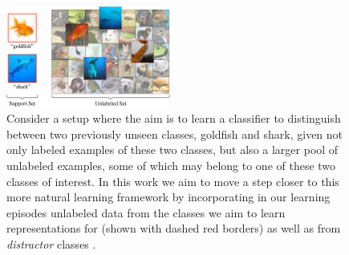 \begin{figure}
    \centering
    \includegraphics[width=0.48\textwidth]{figures/ssl_teaser_grid_distractor_fade_enlarge.pdf}
    \caption{Consider a setup where the aim is to learn a classifier to distinguish between two previously unseen classes, goldfish and shark, given not only labeled examples of these two classes, but also a larger pool of unlabeled examples, some of which may belong to one of these two classes of interest. %
    In this work we aim to move a step closer to this more natural learning framework by incorporating in our learning episodes unlabeled data from the classes we aim to learn representations for (shown with dashed red borders) as well as from {\it distractor} classes .}
    \label{fig:motivation}
    \vspace{-10pt}
\end{figure}
\fi